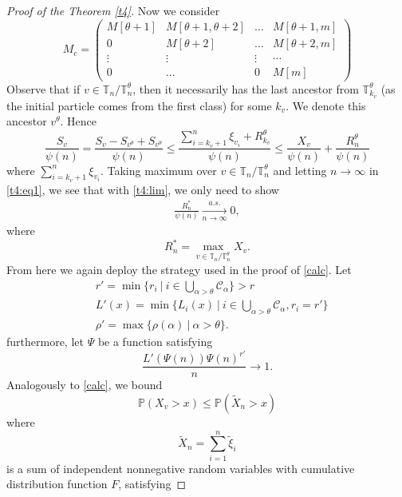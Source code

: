 \documentclass[12pt]{article}
\numberwithin{equation}{section}
\begin{document}
\begin{proof}[Proof of the Theorem \ref{t4}]
Now we consider
\begin{equation}\label{matrix3}
    M_c = \begin{pmatrix}
        M[\theta + 1] & M[\theta+1,\theta+2] & \dots & M[\theta+1,m] \\
        0 & M[\theta+2] & \dots & M[\theta+2,m]\\
        \vdots & \vdots & \vdots & \cdots \\
        0 & \dots & 0 & M[m]
    \end{pmatrix}
\end{equation}
Observe that if $v \in \mathbb{T}_n / \mathbb{T}^\theta_n$, then it necessarily has the last ancestor from $\mathbb{T}^\theta_{k_v}$ (as the initial particle comes from the first class) for some $k_v$. We denote this ancestor $v^\theta$. Hence
\begin{equation} \label{t4:eq1}
    \frac{S_v} {\psi(n) }  = \frac{S_v - S_{v^\theta} + S_{v^\theta}} {\psi(n)}   \leq \frac{\sum_{i = k_v +1}^{n} \xi_{v_i} + R^\theta_{k_v}} {\psi(n)} \leq \frac{X_v}{\psi(n)} + \frac{R^\theta_{n}} {\psi(n)}
\end{equation}
where $\sum_{i = k_v +1}^{n} \xi_{v_i}$. Taking maximum over $v \in \mathbb{T}_n / \mathbb{T}^\theta_n$ and letting $n\rightarrow \infty$ in \eqref{t4:eq1}, we see that with \eqref{t4:lim}, we only need to show 
\begin{align}\label{t4:eq2}
\frac{R^*_n}{\psi(n)}\xrightarrow[n\rightarrow \infty]{a.s.} 0,\end{align} 
where
\[R^*_n = \max_{v \in \mathbb{T}_n / \mathbb{T}^\theta_n} X_v.\] 
From here we again deploy the strategy used in the proof of \eqref{calc}.  Let 
\begin{align*}&r' = \min \{r_i \ | \ i \in \bigcup_{\alpha > \theta} \mathcal{C}_\alpha \} > r \\
&L'(x) = \min \{ L_i(x) \ | \ i \in \bigcup_{\alpha > \theta} \mathcal{C}_\alpha, r_i = r'\} \\&\rho' = \max \{ \rho(\alpha) \ | \ \alpha > \theta\}.
\end{align*} furthermore, let $\Psi$ be a function satisfying
\begin{equation}\label{norm3}
\frac {L'(\Psi(n))\Psi(n)^{r'}} n \rightarrow 1.
\end{equation} Analogously to \eqref{calc}, we bound
\[\mathbb{P}\left( X_v > x\right)\leq \mathbb{P}\left(\tilde{X}_n > x\right)
\]
where 
\[
\tilde{X}_n = \sum_{i=1}^n \tilde{\xi}_i
\]
is a sum of independent nonnegative random variables with cumulative distribution function $F$, satisfying

\end{proof}
\end{document}
